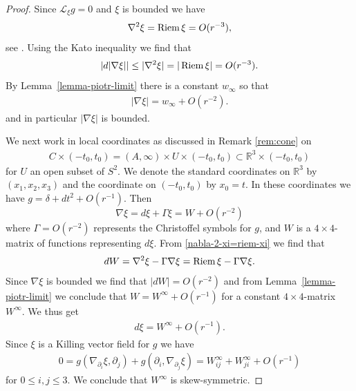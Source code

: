 \documentclass[a4paper,10pt,reqno]{amsart}
\newcommand{\Reals}{\mathbb{R}}
\newcommand{\Riem}{\mathop{\rm Riem}}
\theoremstyle{plain}
\newcommand{\Lie}{\mathcal{L}}
\numberwithin{equation}{section}
\begin{document}
\begin{proof}
Since $\Lie_\xi g = 0$ and $\xi$ is bounded we have 
\begin{equation} \label{nabla-2-xi=riem-xi}
\nabla^2 \xi = \Riem \xi = O(r^{-3}),
\end{equation}
see \cite[Proposition~8.1.3]{PetersenRiemannianGeometry3rd}. Using the Kato inequality we find that 
\begin{align} 
|d |\nabla \xi| | \leq |\nabla^2 \xi| = |\Riem \xi| = O(r^{-3}).
\end{align} 
By Lemma~\ref{lemma-piotr-limit} there is a constant $w_\infty$ so that
\begin{align} 
|\nabla \xi| = w_\infty + O(r^{-2}).
\end{align} 
and in particular $|\nabla \xi|$ is bounded.

We next work in local coordinates as discussed in Remark \ref{rem:cone} on 
\begin{align}
C \times (-t_0,t_0) = (A, \infty) \times U \times (-t_0,t_0)
\subset \Reals^3 \times (-t_0,t_0) 
\end{align} 
for $U$ an open subset of $S^2$. We denote the standard coordinates on $\Reals^3$ by $(x_1,x_2,x_3)$ and the coordinate on $(-t_0,t_0)$ by $x_0=t$. In these coordinates we have $g = \delta + dt^2 + O(r^{-1})$. Then 
\begin{equation} \label{nabla-xi-local}
\nabla \xi = d \xi + \Gamma \xi = W + O(r^{-2})
\end{equation}
where $\Gamma = O(r^{-2})$ represents the Christoffel symbols for $g$, and $W$ is a $4\times 4$-matrix of functions representing $d\xi$. From \eqref{nabla-2-xi=riem-xi} we find that
\begin{equation} \label{dW-equation}
dW = \nabla^2 \xi - \Gamma \nabla \xi = \Riem \xi - \Gamma \nabla \xi.
\end{equation}
Since $\nabla \xi$ is bounded we find that $|dW| = O(r^{-2})$ and from Lemma~\ref{lemma-piotr-limit} we conclude that $W = W^\infty + O(r^{-1})$ for a constant $4\times 4$-matrix $W^\infty$. We thus get 
\begin{align}
d\xi = W^\infty + O(r^{-1}). 
\end{align}
Since $\xi$ is a Killing vector field for $g$ we have
\begin{align}
0 = g(\nabla_{\partial_i} \xi, \partial_j) + g(\partial_i, \nabla_{\partial_j} \xi) 
= W^\infty_{ij} + W^\infty_{ji} + O(r^{-1})
\end{align} 
for $0\leq i,j \leq 3$. We conclude that $W^\infty$ is skew-symmetric.


\end{proof}
\end{document}

